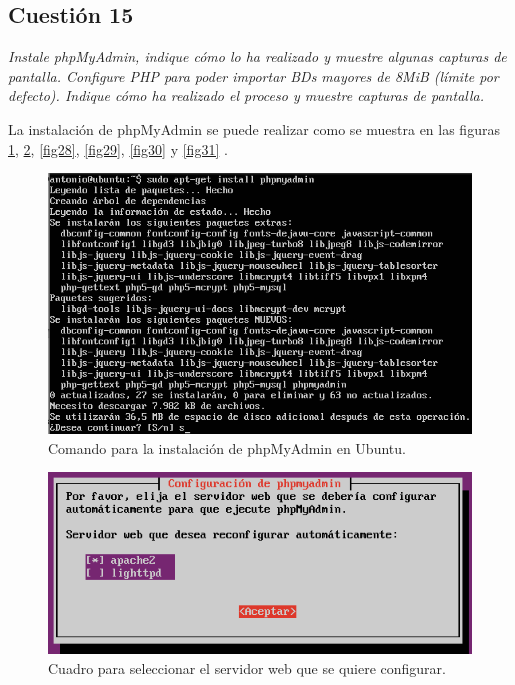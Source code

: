 \subsection{Cuestión 15}
\textit{Instale phpMyAdmin, indique cómo lo ha realizado y muestre algunas capturas de pantalla. Configure PHP para poder importar BDs mayores de 8MiB (límite por defecto). Indique cómo ha realizado el proceso y muestre capturas de pantalla.}
\newline

La instalación de phpMyAdmin se puede realizar como se muestra en las figuras \ref{fig26}, \ref{fig27}, \ref{fig28}, \ref{fig29}, \ref{fig30} y \ref{fig31} . \cite{pma1}

\begin{figure}[H]
    \begin{center}
        \includegraphics[scale=0.5]{imagenes/img29}
        \caption{Comando para la instalación de phpMyAdmin en Ubuntu.}
        \label{fig26}
    \end{center}
\end{figure}

\begin{figure}[H]
    \begin{center}
        \includegraphics[scale=0.5]{imagenes/img30}
        \caption{Cuadro para seleccionar el servidor web que se quiere configurar.}
        \label{fig27}
    \end{center}
\end{figure}

